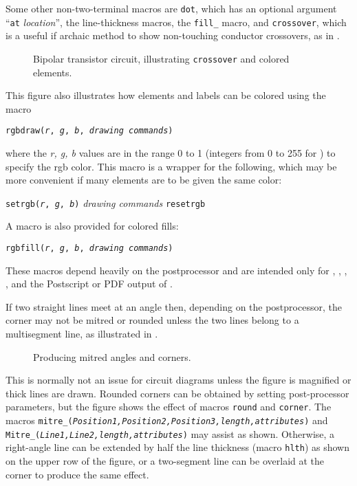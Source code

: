 \pagebreak
Some other non-two-terminal macros are {\tt dot}, which has an
optional argument ``{\tt at} {\sl location}'', the line-thickness
macros, the {\tt fill\_} macro, and {\tt crossover}, which is a useful if
archaic method to show non-touching conductor crossovers, as in
.
\begin{figure}[ht]
   
   \caption{Bipolar transistor circuit, illustrating {\tt crossover}
      and colored elements.}
   \label{bistable}
   \end{figure}

This figure also illustrates how elements and labels can be colored
using the macro
\par
{\tt rgbdraw({\sl r}, {\sl g}, {\sl b}, {\sl drawing commands})}
\par
\noindent
where the {\sl r, g, b} values are in the range 0 to 1
(integers from 0 to 255 for \SVG) to specify the rgb color.
This macro is a wrapper for the following, which may be more convenient
if many elements are to be given the same color:

   {\tt setrgb({\sl r}, {\sl g}, {\sl b})}
      \hfill\break\hspace*{\parindent}%
   {\sl drawing commands}
      \hfill\break\hspace*{\parindent}%
   {\tt resetrgb}

A macro is also provided for colored fills:

{\tt rgbfill({\sl r}, {\sl g}, {\sl b}, {\sl drawing commands})}

\noindent%
These macros depend heavily on the postprocessor and are intended only for 
\PSTricks, \TPGF, \MetaPost, \SVG, and the Postscript or PDF output of \dpic.

%
If two straight lines meet at an angle then, depending on the postprocessor,
the corner may not be mitred or rounded unless the two lines belong to
a multisegment line, as illustrated in .
\begin{figure}[ht]
   
   \caption{Producing mitred angles and corners.}
   \label{Corners}
   \end{figure}
This is normally
not an issue for circuit diagrams unless the figure is magnified or thick
lines are drawn.  Rounded corners can be obtained by setting post-processor
parameters, but the figure shows the effect of
macros {\tt round} and {\tt corner}.
The macros
{\tt mitre\_({\sl Position1,Position2,Position3,length,attributes})}
and
{\tt Mitre\_({\sl Line1,Line2,length,attributes})}
may assist as shown.
Otherwise, a right-angle line can be extended
by half the line thickness (macro {\tt hlth}) as shown on the upper row
of the figure,
or a two-segment line can be overlaid at the corner to produce the same effect.

